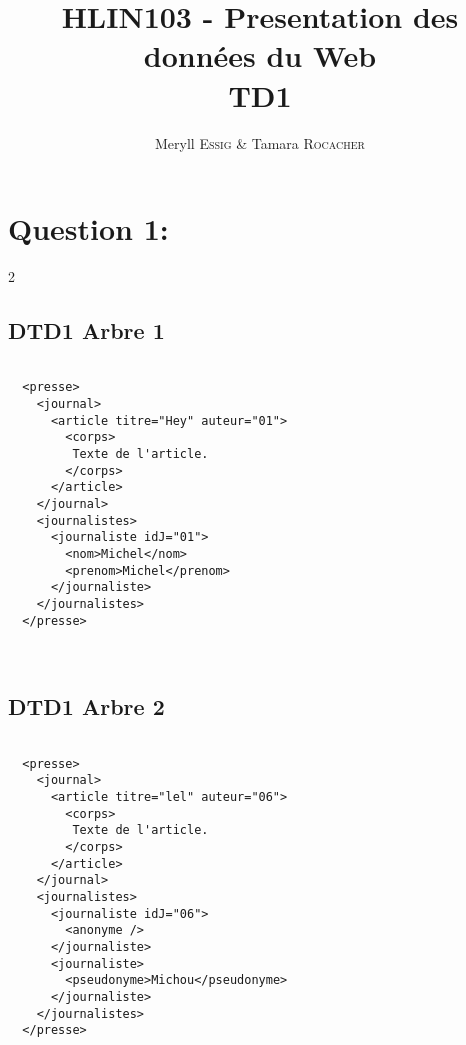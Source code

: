 \documentclass[10pt]{article}
\title{HLIN103 - Presentation des données du Web\\TD1}
\author{Meryll \textsc{Essig} & Tamara \textsc{Rocacher}}
\newenvironment{DDbox}[1]{
\begin{lrbox}{\BBbox}\begin{minipage}{\linewidth}}
{\end{minipage}\end{lrbox}\noindent\colorbox{white}{\usebox{\BBbox}} \\
[.5cm]}
\begin{document}
\maketitle

\section{Question 1:}
\begin{multicols}{2}
  \subsection{DTD1 Arbre 1}


  \begin{DDbox}{0.4}
  \begin{lstlisting}

  <presse>
    <journal>
      <article titre="Hey" auteur="01">
        <corps>
  	     Texte de l'article.
        </corps>
      </article>
    </journal>
    <journalistes>
      <journaliste idJ="01">
        <nom>Michel</nom>
        <prenom>Michel</prenom>
      </journaliste>
    </journalistes>
  </presse>

  \end{lstlisting}
  \end{DDbox}

  \subsection{DTD1 Arbre 2}



  \begin{DDbox}{0.4}
  \begin{lstlisting}

  <presse>
    <journal>
      <article titre="lel" auteur="06">
        <corps>
  	     Texte de l'article.
        </corps>
      </article>
    </journal>
    <journalistes>
      <journaliste idJ="06">
        <anonyme />
      </journaliste>
      <journaliste>
        <pseudonyme>Michou</pseudonyme>
      </journaliste>
    </journalistes>
  </presse>

  \end{lstlisting}
  \end{DDbox}
\end{multicols}
\newpage
\end{document}
